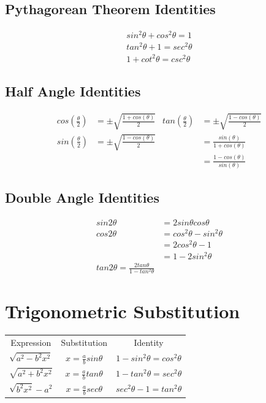 \documentclass[12pt, letterpaper]{article}
\begin{document}
\subsection{Pythagorean Theorem Identities}
\begin{gather*}
  sin^2 \theta + cos^2 \theta = 1\\
  tan^2 \theta + 1 = sec^2 \theta\\
  1 + cot^2 \theta = csc^2 \theta
\end{gather*}

\subsection{Half Angle Identities}
\begin{align*}
  cos(\frac{\theta}{2}) &= \pm \sqrt{\frac{1+cos(\theta)}{2}}&
    tan(\frac{\theta}{2}) &= \pm \sqrt{\frac{1-cos(\theta)}{2}}\\
  sin(\frac{\theta}{2}) &= \pm \sqrt{\frac{1-cos(\theta)}{2}}&
    &= \frac{sin(\theta)}{1+cos(\theta)}\\
  &&
    &= \frac{1-cos(\theta)}{sin(\theta)}
\end{align*}

\subsection{Double Angle Identities}
\begin{align*}
  sin 2\theta &= 2sin\theta cos\theta\\
  cos 2\theta &= cos^2 \theta - sin^2 \theta\\
  &= 2cos^2 \theta - 1\\
  &= 1 - 2sin^2 \theta\\
  tan 2\theta = \frac{2tan\theta}{1-tan^2 \theta}
\end{align*}

\section{Trigonometric Substitution}
\begin{center}
\begin{tabular}{c c c}
Expression & Substitution & Identity\\
$\sqrt{a^2 - b^2 x^2}$ & $x = \frac{a}{b} sin\theta$ & $1-sin^2 \theta = cos^2 \theta$\\
$\sqrt{a^2 + b^2 x^2}$ & $x = \frac{a}{b} tan\theta$ & $1-tan^2\theta = sec^2\theta$\\
$\sqrt{b^2 x^2} - a^2$ & $x = \frac{a}{b} sec\theta$ & $sec^2\theta - 1 = tan^2 \theta$
\end{tabular}
\end{center}
\end{document}
